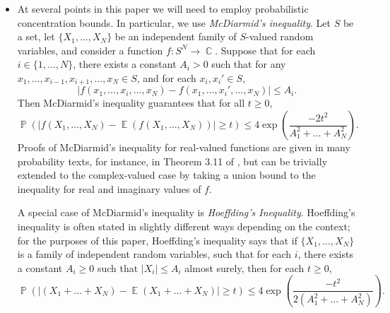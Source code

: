 \documentclass[dvipsnames,letterpaper,12pt]{article}
\numberwithin{equation}{section}
\DeclareMathOperator{\CC}{\mathbb{C}}
\numberwithin{theorem}{section}
\DeclareMathOperator{\EE}{\mathbb{E}}
\DeclareMathOperator{\PP}{\mathbb{P}}
\newcommand{\psitwo}[1]{\| {#1} \|_{\psi_2(L)}}
\begin{document}
\begin{itemize}
    \item At several points in this paper we will need to employ probabilistic concentration bounds. In particular, we use \emph{McDiarmid's inequality}. Let $S$ be a set, let $\{ X_1, \dots, X_N \}$ be an independent family of $S$-valued random variables, and consider a function $f: S^N \to \CC$. Suppose that for each $i \in \{ 1, \dots, N \}$, there exists a constant $A_i > 0$ such that for any $x_1, \dots, x_{i-1}, x_{i+1}, \dots, x_N \in S$, and for each $x_i, x_i' \in S$,
    \[ |f(x_1, \dots, x_i, \dots, x_N) - f(x_1, \dots, x_i', \dots, x_N)| \leq A_i. \]
    Then McDiarmid's inequality guarantees that for all $t \geq 0$,
    \[ \PP \left( |f(X_1, \dots, X_N) - \EE(f(X_1, \dots, X_N))| \geq t \right) \leq 4 \exp \left( \frac{-2t^2}{A_1^2 + \dots + A_N^2} \right). \]
    Proofs of McDiarmid's inequality for real-valued functions are given in many probability texts, for instance, in Theorem 3.11 of \cite{VanHandel}, but can be trivially extended to the complex-valued case by taking a union bound to the inequality for real and imaginary values of $f$.

    A special case of McDiarmid's inequality is \emph{Hoeffding's Inequality}. Hoeffding's inequality is often stated in slightly different ways depending on the context; for the purposes of this paper, Hoeffding's inequality says that if $\{ X_1, \dots, X_N \}$ is a family of independent random variables, such that for each $i$, there exists a constant $A_i \geq 0$ such that $|X_i| \leq A_i$ almost surely, then for each $t \geq 0$,
    \[ \PP \left( |(X_1 + \dots + X_N) - \EE(X_1 + \dots + X_N)| \geq t \right) \leq 4 \exp \left(\frac{-t^2}{2(A_1^2 + \dots + A_N^2)} \right). \]

    \begin{comment}

    \item Our random construction involves a probabilistic concentration of measure argument. Define a convex function $\psi_2: [0,\infty) \to [0,\infty)$ by setting
    \[ \psi_2(t) = e^{t^2} - 1, \]
    The function $\psi_2$ induces an Orlicz norm on the family of scalar valued random variables over a probability space by setting, for each random variable $X$,
    \[ \psitwo{X} = \inf \left\{ A \in (0,\infty) : \EE(\psi_2(|X|/A)) \leq 1 \right\}. \]
    The family of random variables with $\psitwo{X} < \infty$ are known as \emph{subgaussian random variables}. Here are the important properties of subgaussian random variables which we use in this paper:
    \begin{itemize}
        \item If $\psitwo{X} \leq A$, then for each $t \geq 0$,
        \[ \PP \left( |X| \geq t \right) \leq 10 \exp \left( -t^2/10A^2 \right). \]
        Thus Subgaussian random variables have Gaussian tails.


\end{comment}
\end{itemize}
\end{document}
